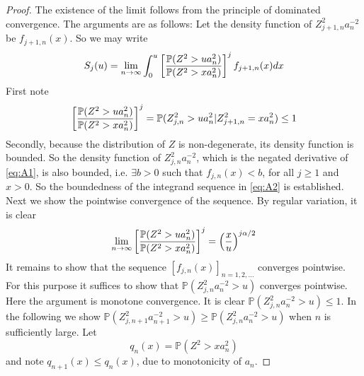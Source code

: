 \documentclass[11pt,reqno]{amsart}
\renewcommand{\P}{\mathbb{P}}
\newcommand{\1}{\mathds{1}}
\newcommand{\0}{\boldsymbol{0}}
\newcommand{\4}{\mathchoice{\mskip1.5mu}{\mskip1.5mu}{}{}}
\newcommand{\5}{\mathchoice{\mskip-1.5mu}{\mskip-1.5mu}{}{}}
\newcommand{\2}{\penalty250\mskip\thickmuskip\mskip-\thinmuskip} %
\begin{document}
\begin{proof}
The existence of the limit follows from the principle of dominated
convergence. The arguments are as follows: Let the density function of
$Z_{j+1, n}^2 a_n^{-2}$ be $f_{j+1,n}(x)$. So we may write
\begin{equation}
  \label{eq:A2}
  S_j(u) = \lim_{n \to \infty}\int_{0}^u \left[
    {\P(Z^2 > ua_n^2) \over \P(Z^2 > xa_n^2)}
  \right]^j f_{j+1,n}(x)dx
\end{equation}
First note
\[
\left[
    {\P(Z^2 > ua_n^2) \over \P(Z^2 > xa_n^2)}
  \right]^j = \P(Z_{j,n}^2 > ua_n^2 | Z_{j+1, n}^2 = xa_n^2) \leq 1
\]
Secondly, because the distribution of $Z$ is non-degenerate, its
density function is bounded. So the density function of
$Z_{j,n}^2a_n^{-2}$, which is the negated derivative of
\eqref{eq:A1}, is also bounded, i.e. $\exists b > 0$ such that
$f_{j, n}(x) < b$, for all $j \geq 1$ and $x > 0$. So the
boundedness of the integrand sequence in \eqref{eq:A2} is
established. Next we show the pointwise convergence of the
sequence. By regular variation, it is clear
\[
\lim_{n \to \infty} \left[
    {\P(Z^2 > ua_n^2) \over \P(Z^2 > xa_n^2)}
  \right]^j = \left(
    x \over u
    \right)^{j\alpha/2}
\]
It remains to show that the sequence $[f_{j,n}(x)]_{n=1,2,\dots}$
converges pointwise. For this purpose it suffices to show that
$\P(Z_{j, n}^2 a_n^{-2} > u)$ converges pointwise. Here the argument
is monotone convergence. It is clear $\P(Z_{j, n}^2 a_n^{-2} > u) \leq
1$. In the following we show $\P(Z_{j, n+1}^2 a_{n+1}^{-2} > u) \geq
\P(Z_{j, n}^2 a_n^{-2} > u)$ when $n$ is sufficiently large. Let
\[
q_n(x) = \P(Z^2 > x a_n^2)
\]
and note $q_{n+1}(x) \leq q_n(x)$, due to monotonicity of $a_n$.

\end{proof}
\end{document}
